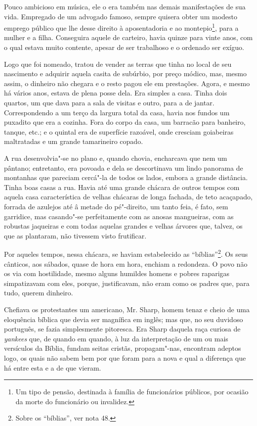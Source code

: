 Pouco ambicioso em música, ele o era também nas demais manifestações de
sua vida. Empregado de um advogado famoso, sempre quisera obter um
modesto emprego público que lhe desse direito à aposentadoria e ao
montepio\footnote{Um tipo de pensão, destinada à família de funcionários
  públicos, por ocasião da morte do funcionário ou invalidez.}, para a
mulher e a filha. Conseguira aquele de carteiro, havia quinze para vinte
anos, com o qual estava muito contente, apesar de ser trabalhoso e o
ordenado ser exíguo.

Logo que foi nomeado, tratou de vender as terras que tinha no local de
seu nascimento e adquirir aquela casita de subúrbio, por preço módico,
mas, mesmo assim, o dinheiro não chegara e o resto pagou ele em
prestações. Agora, e mesmo há vários anos, estava de plena posse dela.
Era simples a casa. Tinha dois quartos, um que dava para a sala de
visitas e outro, para a de jantar. Correspondendo a um terço da largura
total da casa, havia nos fundos um puxadito que era a cozinha. Fora do
corpo da casa, um barracão para banheiro, tanque, etc.; e o quintal era
de superfície razoável, onde cresciam goiabeiras maltratadas e um grande
tamarineiro copado.

A rua desenvolvia"-se no plano e, quando chovia, encharcava que nem um
pântano; entretanto, era povoada e dela se descortinava um lindo
panorama de montanhas que pareciam cercá"-la de todos os lados, embora a
grande distância. Tinha boas casas a rua. Havia até uma grande chácara
de outros tempos com aquela casa característica de velhas chácaras de
longa fachada, de teto acaçapado, forrada de azulejos até â metade do
pé"-direito, um tanto feia, é fato, sem garridice, mas casando"-se
perfeitamente com as anosas mangueiras, com as robustas jaqueiras e com
todas aquelas grandes e velhas árvores que, talvez, os que as plantaram,
não tivessem visto frutificar.

Por aqueles tempos, nessa chácara, se haviam estabelecido as
``bíblias''\footnote{Sobre os ``bíblias'', ver nota 48.}. Os seus
cânticos, aos sábados, quase de hora em hora, enchiam a redondeza. O
povo não os via com hostilidade, mesmo alguns humildes homens e pobres
raparigas simpatizavam com eles, porque, justificavam, não eram como os
padres que, para tudo, querem dinheiro.

Chefiava os protestantes um americano, Mr. Sharp, homem tenaz e cheio de
uma eloquência bíblica que devia ser magnífica em inglês; mas que, no
seu duvidoso português, se fazia simplesmente pitoresca. Era Sharp
daquela raça curiosa de \emph{yankees} que, de quando em quando, à luz
da interpretação de um ou mais versículos da Bíblia, fundam seitas
cristãs, propagam"-nas, encontram adeptos logo, os quais não sabem bem
por que foram para a nova e qual a diferença que há entre esta e a de
que vieram.

